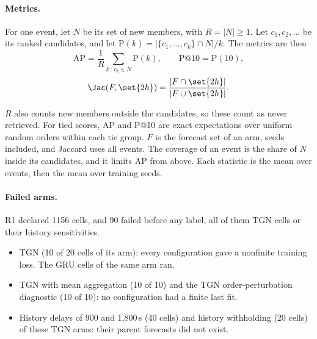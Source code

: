 \paragraph{Metrics.}
For one event, let $N$ be its set of new members, with $R = |N| \geq 1$.
Let $c_1, c_2, \ldots$ be its ranked candidates, and let $\mathrm{P}(k) = |\{c_1, \ldots, c_k\} \cap N| / k$.
The metrics are then
\[
\mathrm{AP} = \frac{1}{R} \sum_{k\,:\,c_k \in N} \mathrm{P}(k), \qquad \mathrm{P@10} = \mathrm{P}(10),
\]
\[
\Jac(F, \set{2h}) = \frac{|F \cap \set{2h}|}{|F \cup \set{2h}|}.
\]

$R$ also counts new members outside the candidates, so these count as never retrieved.
For tied scores, AP and P@10 are exact expectations over uniform random orders within each tie group.
$F$ is the forecast set of an arm, seeds included, and Jaccard uses all events.
The coverage of an event is the share of $N$ inside its candidates, and it limits AP from above.
Each statistic is the mean over events, then the mean over training seeds.

\paragraph{Failed arms.}
R1 declared \num{1156} cells, and 90 failed before any label, all of them TGN cells or their history sensitivities.
\begin{itemize}
\item TGN (10 of 20 cells of its arm): every configuration gave a nonfinite training loss.
The GRU cells of the same arm ran.
\item TGN with mean aggregation (10 of 10) and the TGN order-perturbation diagnostic (10 of 10): no configuration had a finite last fit.
\item History delays of 900 and 1,800\,s (40 cells) and history withholding (20 cells) of these TGN arms: their parent forecasts did not exist.
\end{itemize}

